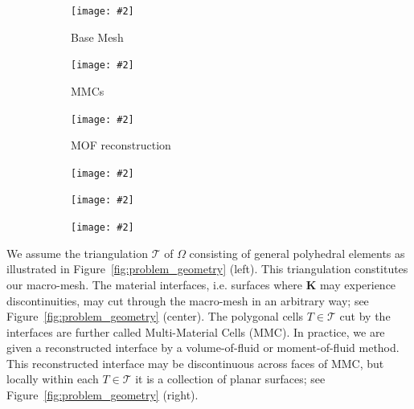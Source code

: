 \documentclass[12pt]{article}
\newcommand{\includegraphicsw}[2][1.]{\texttt{[image: \#2]}}
\newcommand{\vect}[1]{\boldsymbol{\mathbf{#1}}}
\newcommand{\bcell}{T}
\newcommand{\bmesh}{{\vect{\mathcal T}}}
\begin{document}
	
	\begin{figure}[h]
		\centering
		\caption{The figure illustrates global unstructured polyhedral mesh (left); Physical interfaces for three materials and cut cells, i.e. multi-material cells (central); The piecewise-planar discontinuous reconstruction of the interfaces by the moment of fluid method (right). Everything is shown for two refinement level of the base mesh. \label{fig:problem_geometry}}
		\begin{subfigure}{.33\linewidth}
			\centering
			\includegraphicsw{ring_base_voronoi.png}
			\caption{Base Mesh}
			\label{fig:problem_geometry:base_mesh}
		\end{subfigure}%
		\hfill
		\begin{subfigure}{.33\linewidth}
			\centering
			\includegraphicsw{ring_mmcs_voronoi.png}
			\caption{MMCs}
			\label{fig:problem_geometry:mmcs}
		\end{subfigure}%
		\hfill
		\begin{subfigure}{.33\linewidth}
			\centering
			\includegraphicsw{ring_mini_voronoi.png}
			\caption{MOF reconstruction}
			\label{fig:problem_geometry:mof}
		\end{subfigure}
		\begin{subfigure}{.33\linewidth}
			\centering
			\includegraphicsw{ring_base_voronoi_refined.png}
		\end{subfigure}%
		\hfill
		\begin{subfigure}{.33\linewidth}
			\centering
			\includegraphicsw{ring_mmcs_voronoi_refined.png}
		\end{subfigure}%
		\hfill
		\begin{subfigure}{.33\linewidth}
			\centering
			\includegraphicsw{ring_mini_voronoi_refined.png}
		\end{subfigure}
	\end{figure}
	
We assume the triangulation  $\bmesh$ of $\Omega$ consisting of general polyhedral elements as illustrated in Figure~\ref{fig:problem_geometry} (left). This triangulation constitutes our macro-mesh. The material interfaces, i.e. surfaces where $\vect K$ may experience discontinuities, may cut through the macro-mesh in an arbitrary way; see Figure~\ref{fig:problem_geometry} (center). The polygonal cells ${\bcell \in \bmesh}$ cut by the interfaces are further called Multi-Material Cells (MMC). In practice,  we are given a reconstructed interface by a volume-of-fluid or moment-of-fluid method. This reconstructed interface may be discontinuous across faces of MMC, but locally within each ${\bcell \in \bmesh}$ it is a collection of planar surfaces; see Figure~\ref{fig:problem_geometry} (right).
\end{document}
